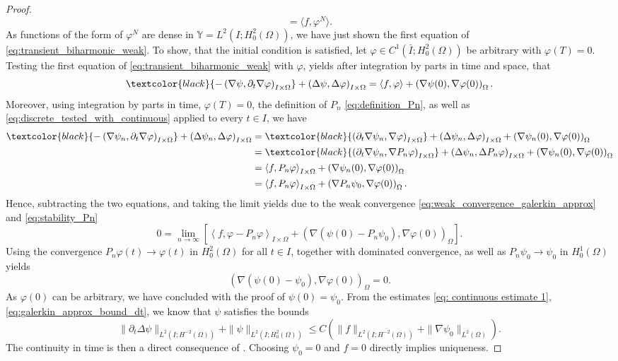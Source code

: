 \documentclass{m2an}
\newcommand{\1}{\mathds{1}}
\newcommand{\Om}{\Omega}
\newcommand{\IOprod}[1]{\left( #1 \right)_{I\times \Omega}}
\newcommand{\IOpair}[1]{\left\langle #1 \right\rangle_{I\times \Omega}}
\newcommand{\revB}[1]{\textcolor{black}{#1}}
\newcommand{\na}{\nabla}
\newcommand{\Oprod}[1]{\left(#1\right)_{\Omega}}
\newcommand{\YY}{\mathbb{Y}}
\theoremstyle{definition}
\newcommand{\Cref}[1]{\zcref{#1}}
\begin{document}
\begin{proof}
\[        = \langle f, \varphi^N \rangle.
\]
As functions of the form of $\varphi^N$ are dense in $\YY=L^2(I;H^2_0(\Omega))$, we have just shown the first equation of 
\eqref{eq:transient_biharmonic_weak}.
To show, that the initial condition is   satisfied, let $\varphi \in C^1(\bar I;H^2_0(\Om))$ be arbitrary
with $\varphi(T) = 0$.
Testing the first equation of \eqref{eq:transient_biharmonic_weak} with $\varphi$, yields after integration
by parts in time and space, that 
\[
    \revB{-\IOprod{\nabla \psi, \partial_t \nabla \varphi}}+\IOprod{\Delta \psi, \Delta \varphi}
    = \langle f, \varphi \rangle + \Oprod{\nabla \psi(0), \nabla \varphi(0)}.
\]
Moreover, using integration by parts in time, $\varphi(T) = 0$,
the definition of $P_n$ \eqref{eq:definition_Pn}, as well as
\eqref{eq:discrete_tested_with_continuous} applied to every $t \in I$, we have
\begin{align*}
    \revB{-\IOprod{\nabla \psi_n, \partial_t \nabla \varphi}}+\IOprod{\Delta \psi_n, \Delta \varphi}
    &=\revB{\IOprod{\partial_t \nabla \psi_n, \nabla \varphi}}+\IOprod{\Delta \psi_n, \Delta \varphi}
    + \Oprod{\nabla \psi_n(0), \nabla \varphi(0)}\\
    &=\revB{\IOprod{\partial_t \nabla \psi_n, \nabla P_n \varphi}}+\IOprod{\Delta \psi_n, \Delta P_n \varphi}
    + \Oprod{\nabla \psi_n(0), \nabla \varphi(0)}\\
    &= \IOpair{ f, P_n\varphi } + \Oprod{\nabla \psi_n(0), \nabla \varphi(0)}\\
    &= \IOpair{ f, P_n\varphi } + \Oprod{\nabla P_n\psi_0, \nabla \varphi(0)}.
\end{align*}
Hence, subtracting the two equations, and taking the limit yields due to the weak convergence 
\eqref{eq:weak_convergence_galerkin_approx} and \eqref{eq:stability_Pn}
\[
    0= \lim_{n\to\infty} \left[ \IOpair{ f, \varphi - P_n \varphi} +
     \Oprod{\nabla(\psi(0) - P_n\psi_0),\nabla\varphi(0)}\right].
     \]
Using the convergence $P_n \varphi(t) \to \varphi(t)$ in $H^2_0(\Om)$ for all $t \in I$, together
with dominated convergence, as well as $P_n \psi_0 \to \psi_0$ in $H^1_0(\Om)$ yields
\begin{equation*}
    \Oprod{\nabla(\psi(0) - \psi_0),\nabla \varphi(0)} = 0.
\end{equation*}
As $\varphi(0)$ can be arbitrary, we have concluded with the proof of $\psi(0)=\psi_0$.
From the estimates \eqref{eq: continuous estimate 1},\eqref{eq:galerkin_approx_bound_dt}, we know that 
$\psi$ satisfies the bounds 
$$
\|\partial_t \Delta \psi\|_{L^2(I;H^{-2}(\Omega))} 
+ \|\psi\|_{L^2(I;H^2_0(\Omega))}
\le C\left(\|f\|_{L^2(I;H^{-2}(\Om))}+\|\na \psi_0\|_{L^2(\Om)}\right).
$$
The continuity in time is then a direct consequence of \Cref{lemm:H1_continuity}.
Choosing $\psi_0 =0$ and $f=0$ directly implies uniqueness.
\end{proof}
\end{document}
